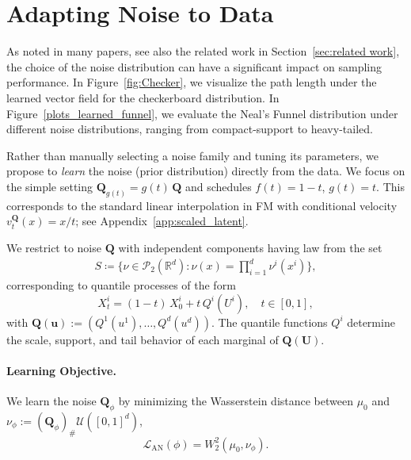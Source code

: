 \documentclass{article}
\newcommand{\R}{\mathbb{R}}
\theoremstyle{plain}
\theoremstyle{definition}
\theoremstyle{remark}
\begin{document}
\section{Adapting Noise to Data}\label{sec:learning_q}

As noted in many papers, see also the related work in Section~\ref{sec:related work}, the choice of the noise distribution can have a significant impact on sampling performance. In Figure~\ref{fig:Checker}, we visualize the path length under the learned vector field for the checkerboard distribution. In Figure~\ref{plots_learned_funnel}, we evaluate the Neal's Funnel \cite{neal2003slice} distribution under different noise distributions, ranging from compact-support to heavy-tailed.

Rather than manually selecting a noise family and tuning its parameters, we propose to \emph{learn} the noise (prior distribution) directly from the data. We
focus on the simple setting  $\mathbf{Q}_{g(t)} = g(t) \, \mathbf{Q}$ and schedules $f(t) = 1-t$,  $g(t) = t$. This corresponds to the standard linear interpolation in FM with conditional velocity $v^{\mathbf{Q}}_t(x) = x/t$; see Appendix~\ref{app:scaled_latent}.

We restrict to noise $\mathbf{Q}$  with independent components having law from the set
\begin{align*}
    S \coloneqq \big\{\nu \in \mathcal P_2(\R^d): \nu(x) = \prod_{i=1}^d \nu^i(x^i) \big\},
\end{align*}
corresponding to quantile processes of the form
\begin{equation}\label{eq:learnnoise-quantile-process}
X_t^{i} = (1-t)\,X_0^{i} + t\, Q^{i}(U^i), \quad t\in[0,1],
\end{equation}
with $\mathbf{Q}(\mathbf{u}) := (Q^1(u^1), \ldots, Q^d(u^d))$. The quantile functions $Q^i$ determine the scale, support, and tail behavior of each marginal of $\mathbf{Q}(\mathbf{U})$.
  
\paragraph{Learning Objective.} We learn the noise $\mathbf{Q}_\phi$ by minimizing the  Wasserstein distance between $\mu_0$ and $\nu_\phi := (\mathbf{Q}_\phi)_\# \mathcal{U}([0,1]^d)$, 
\begin{equation}\label{loss1:quantile-loss}
    \mathcal{L}_{\mathrm{AN}}(\phi) = W_2^2(\mu_0, \nu_\phi).
\end{equation}
\end{document}
